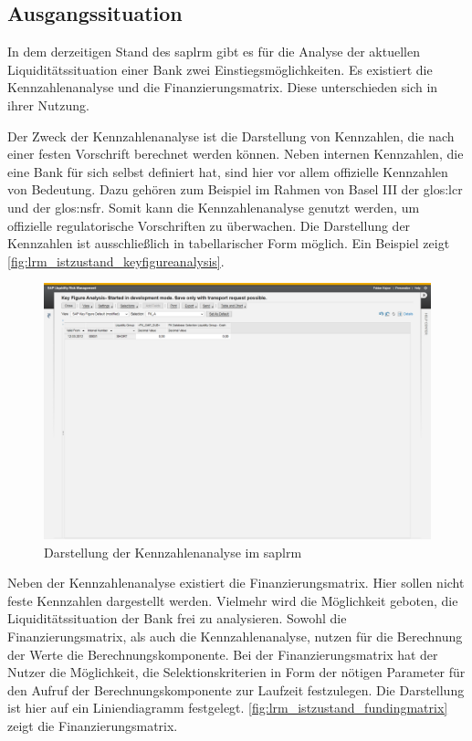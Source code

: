 \begin{onehalfspacing}
\section{Ausgangssituation}
In dem derzeitigen Stand des \gls{saplrm} gibt es für die Analyse der aktuellen Liquiditätssituation einer Bank zwei Einstiegsmöglichkeiten. Es existiert die Kennzahlenanalyse und die Finanzierungsmatrix. Diese unterschieden sich in ihrer Nutzung.

Der Zweck der Kennzahlenanalyse ist die Darstellung von Kennzahlen, die nach einer festen Vorschrift berechnet werden können. Neben internen Kennzahlen, die eine Bank für sich selbst definiert hat, sind hier vor allem offizielle Kennzahlen von Bedeutung. Dazu gehören zum Beispiel im Rahmen von Basel III der \gls{glos:lcr} und der \gls{glos:nsfr}. Somit kann die Kennzahlenanalyse genutzt werden, um offizielle regulatorische Vorschriften zu überwachen. Die Darstellung der Kennzahlen ist ausschließlich in tabellarischer Form möglich. Ein Beispiel zeigt \vref{fig:lrm_istzustand_keyfigureanalysis}.

\begin{figure}[ht]
\centering
\setlength{\unitlength}{1mm}
\includegraphics[width=15cm]{images/KeyFigureAnalysis_Example-crop.png}
\caption{Darstellung der Kennzahlenanalyse im \gls{saplrm}\label{fig:lrm_istzustand_keyfigureanalysis}}
\end{figure}

Neben der Kennzahlenanalyse existiert die Finanzierungsmatrix. Hier sollen nicht feste Kennzahlen dargestellt werden. Vielmehr wird die Möglichkeit geboten, die Liquiditätssituation der Bank frei zu analysieren. Sowohl die Finanzierungsmatrix, als auch die Kennzahlenanalyse, nutzen für die Berechnung der Werte die Berechnungskomponente. Bei der Finanzierungsmatrix hat der Nutzer die Möglichkeit, die Selektionskriterien in Form der nötigen Parameter für den Aufruf der Berechnungskomponente zur Laufzeit festzulegen. Die Darstellung ist hier auf ein Liniendiagramm festgelegt. \vref{fig:lrm_istzustand_fundingmatrix} zeigt die Finanzierungsmatrix.


\end{onehalfspacing}
